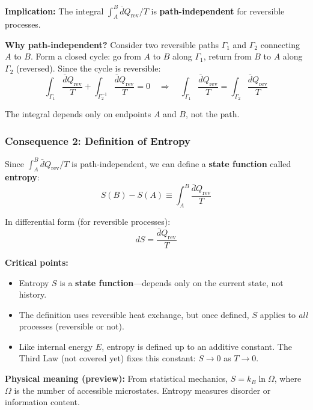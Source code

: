 \documentclass[9pt,twocoloumn]{article}
\begin{document}
\textbf{Implication:} The integral $\int_A^B \bar{d}Q_{\text{rev}}/T$ is \textbf{path-independent} for reversible processes.

\textbf{Why path-independent?} Consider two reversible paths $\Gamma_1$ and $\Gamma_2$ connecting $A$ to $B$. Form a closed cycle: go from $A$ to $B$ along $\Gamma_1$, return from $B$ to $A$ along $\Gamma_2$ (reversed). Since the cycle is reversible:
\begin{equation}
\int_{\Gamma_1} \frac{\bar{d}Q_{\text{rev}}}{T} + \int_{\Gamma_2^{-1}} \frac{\bar{d}Q_{\text{rev}}}{T} = 0 \quad \Rightarrow \quad \int_{\Gamma_1} \frac{\bar{d}Q_{\text{rev}}}{T} = \int_{\Gamma_2} \frac{\bar{d}Q_{\text{rev}}}{T}
\end{equation}

The integral depends only on endpoints $A$ and $B$, not the path.

\subsubsection{Consequence 2: Definition of Entropy}

Since $\int_A^B \bar{d}Q_{\text{rev}}/T$ is path-independent, we can define a \textbf{state function} called \textbf{entropy}:
\begin{equation}
\boxed{S(B) - S(A) \equiv \int_A^B \frac{\bar{d}Q_{\text{rev}}}{T}}
\end{equation}

In differential form (for reversible processes):
\begin{equation}
\boxed{dS = \frac{\bar{d}Q_{\text{rev}}}{T}}
\end{equation}

\textbf{Critical points:}
\begin{itemize}
    \item Entropy $S$ is a \textbf{state function}—depends only on the current state, not history.
    \item The definition uses reversible heat exchange, but once defined, $S$ applies to \emph{all} processes (reversible or not).
    \item Like internal energy $E$, entropy is defined up to an additive constant. The Third Law (not covered yet) fixes this constant: $S \to 0$ as $T \to 0$.
\end{itemize}

\textbf{Physical meaning (preview):} From statistical mechanics, $S = k_B \ln \Omega$, where $\Omega$ is the number of accessible microstates. Entropy measures disorder or information content.
\end{document}
